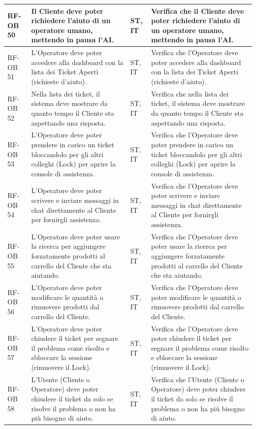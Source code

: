 \documentclass[a4paper,11pt,oneside]{scrartcl}
\begin{document}
\begin{longtable}{|p{1.5cm}|p{4.5cm}|p{1.8cm}|p{6cm}|}
RF-OB 50 & Il Cliente deve poter richiedere l'aiuto di un operatore umano, mettendo in pausa l'AI. & ST, IT & Verifica che il Cliente deve poter richiedere l'aiuto di un operatore umano, mettendo in pausa l'AI. \\ \hline
RF-OB 51 & L'Operatore deve poter accedere alla dashboard con la lista dei Ticket Aperti (richieste d'aiuto). & ST, IT & Verifica che l'Operatore deve poter accedere alla dashboard con la lista dei Ticket Aperti (richieste d'aiuto). \\ \hline
RF-OB 52 & Nella lista dei ticket, il sistema deve mostrare da quanto tempo il Cliente sta aspettando una risposta. & ST, IT & Verifica che nella lista dei ticket, il sistema deve mostrare da quanto tempo il Cliente sta aspettando una risposta. \\ \hline
RF-OB 53 & L'Operatore deve poter prendere in carico un ticket bloccandolo per gli altri colleghi (Lock) per aprire la console di assistenza. & ST, IT & Verifica che l'Operatore deve poter prendere in carico un ticket bloccandolo per gli altri colleghi (Lock) per aprire la console di assistenza. \\ \hline
RF-OB 54 & L'Operatore deve poter scrivere e inviare messaggi in chat direttamente al Cliente per fornirgli assistenza. & ST, IT & Verifica che l'Operatore deve poter scrivere e inviare messaggi in chat direttamente al Cliente per fornirgli assistenza. \\ \hline
RF-OB 55 & L'Operatore deve poter usare la ricerca per aggiungere forzatamente prodotti al carrello del Cliente che sta aiutando. & ST, IT & Verifica che l'Operatore deve poter usare la ricerca per aggiungere forzatamente prodotti al carrello del Cliente che sta aiutando. \\ \hline
RF-OB 56 & L'Operatore deve poter modificare le quantità o rimuovere prodotti dal carrello del Cliente. & ST, IT & Verifica che l'Operatore deve poter modificare le quantità o rimuovere prodotti dal carrello del Cliente. \\ \hline
RF-OB 57 & L'Operatore deve poter chiudere il ticket per segnare il problema come risolto e sbloccare la sessione (rimuovere il Lock). & ST, IT & Verifica che l'Operatore deve poter chiudere il ticket per segnare il problema come risolto e sbloccare la sessione (rimuovere il Lock). \\ \hline
RF-OB 58 & L'Utente (Cliente o Operatore) deve poter chiudere il ticket da solo se risolve il problema o non ha più bisogno di aiuto. & ST, IT & Verifica che l'Utente (Cliente o Operatore) deve poter chiudere il ticket da solo se risolve il problema o non ha più bisogno di aiuto. \\ \hline

\end{longtable}
\end{document}
